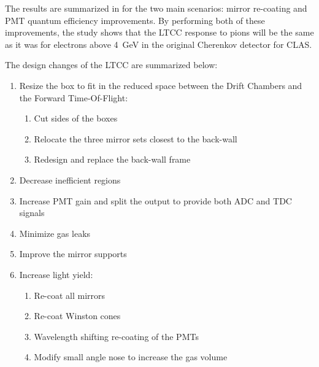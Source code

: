 The results are summarized in  for the two main scenarios: mirror re-coating and PMT quantum
efficiency improvements. By performing both of these improvements, the study shows that the LTCC response to pions
will be the same as it was for electrons above 4~GeV in the original Cherenkov detector for CLAS.

The design changes of the LTCC are summarized below:

\begin{enumerate}
\item Resize the box to fit in the reduced space between the Drift Chambers and the Forward Time-Of-Flight:
	\begin{enumerate}
		\item Cut sides of the boxes
		\item Relocate the three mirror sets closest to the back-wall
		\item Redesign and replace the back-wall frame
	\end{enumerate}

	\item Decrease inefficient regions
	\item Increase PMT gain and split the output to provide both ADC and TDC signals
	\item Minimize gas leaks
	\item Improve the mirror supports
	\item Increase light yield:
	\begin{enumerate}
		\item Re-coat all mirrors
		\item Re-coat Winston cones
		\item Wavelength shifting re-coating of the PMTs
		\item Modify small angle nose to increase the gas volume
	\end{enumerate}
\end{enumerate}








